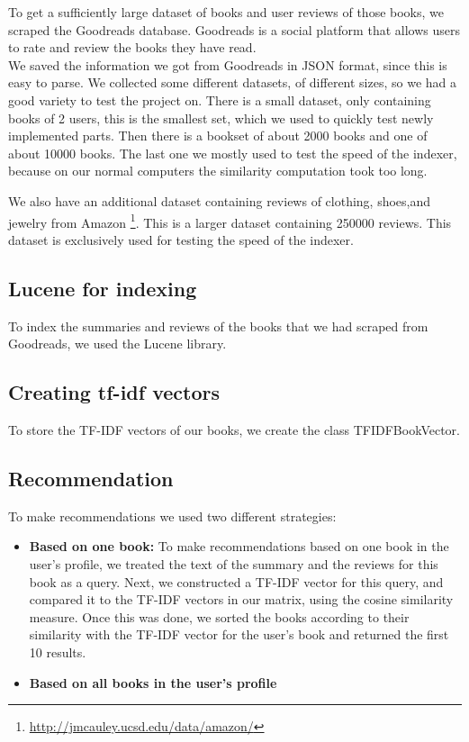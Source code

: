 \documentclass[10pt,a4paper]{paper}
\begin{document}
To get a sufficiently large dataset of books and user reviews of those books, we scraped the Goodreads database. Goodreads is a social platform that allows users to rate and review the books they have read. \\
We saved the information we got from Goodreads in JSON format, since this is easy to parse.
We collected some different datasets, of different sizes, so we had a good variety to test the project on. There is a small dataset, only containing books of 2 users, this is the smallest set, which we used to quickly test newly implemented parts. Then there is a bookset of about 2000 books and one of about 10000 books. The last one we mostly used to test the speed of the indexer, because on our normal computers the similarity computation took too long.

We also have an additional dataset containing reviews of clothing, shoes,and jewelry from Amazon \footnote{\url{http://jmcauley.ucsd.edu/data/amazon/}}. This is a larger dataset containing 250000 reviews. This dataset is exclusively used for testing the speed of the indexer.

\subsection{Lucene for indexing}

To index the summaries and reviews of the books that we had scraped from Goodreads, we used the Lucene library. %

\subsection{Creating tf-idf vectors}

To store the TF-IDF vectors of our books, we create the class TFIDFBookVector.


\subsection{Recommendation}

To make recommendations we used two different strategies:
\begin{itemize}
\item \textbf{Based on one book:} To make recommendations based on one book in the user's profile, we treated the text of the summary and the reviews for this book as a query. Next, we constructed a TF-IDF vector for this query, and compared it to the TF-IDF vectors in our matrix, using the cosine similarity measure. Once this was done, we sorted the books according to their similarity with the TF-IDF vector for the user's book and returned the first 10 results.
\item \textbf{Based on all books in the user's profile} %
\end{itemize}
\end{document}
